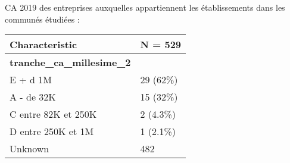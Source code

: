 \documentclass[
  french,
]{article}
\begin{document}
CA 2019 des entreprises auxquelles appartiennent les établissements dans
les communés étudiées :

\begin{longtable}[]{@{}ll@{}}
\toprule
\textbf{Characteristic} & \textbf{N = 529} \\
\midrule
\endhead
\textbf{tranche\_ca\_millesime\_2} & \\
E + d 1M & 29 (62\%) \\
A - de 32K & 15 (32\%) \\
C entre 82K et 250K & 2 (4.3\%) \\
D entre 250K et 1M & 1 (2.1\%) \\
Unknown & 482 \\
\bottomrule
\end{longtable}
\end{document}
